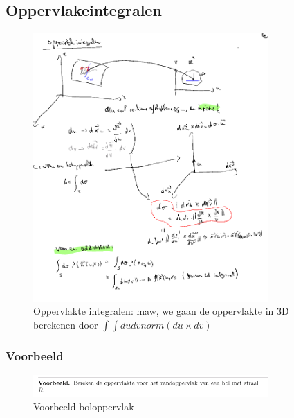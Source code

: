 \documentclass[a4paper]{article}
\begin{document}
\subsection{Oppervlakeintegralen}


\begin{figure}[H]
	\centering
	\includegraphics[width=0.8\textwidth]{assets/oppervlakte_integraal_uitleg.png}
	\caption{Oppervlakte integralen: maw, we gaan de oppervlakte in 3D berekenen door $\int \int du dv norm(du \times dv)$}
	\label{fig:oppervlakte_integraal_uitleg}
\end{figure}

\subsubsection{Voorbeeld}

\begin{figure}[H]
	\centering
	\includegraphics[width=0.8\textwidth]{assets/voorbeeld_boloppervlak.png}
	\caption{Voorbeeld boloppervlak}
	\label{fig:voorbeeld_boloppervlak}
\end{figure}
\end{document}
